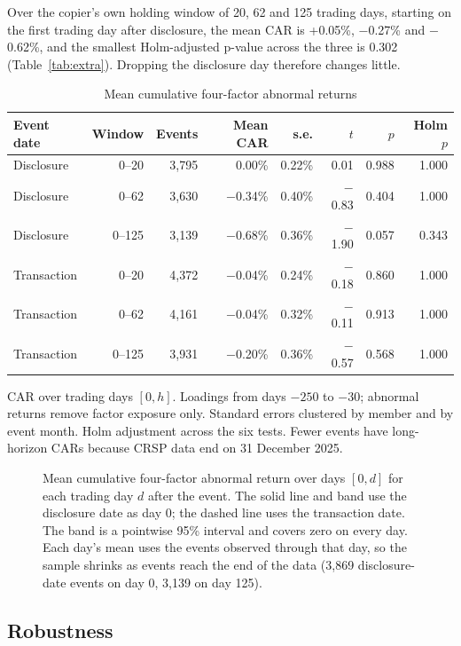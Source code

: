 \documentclass[11pt]{article}
\newcommand{\m}{\ensuremath{-}}
\begin{document}
Over the copier's own holding window of 20, 62 and 125 trading days, starting on the first trading day after disclosure, the mean CAR is +0.05\%, \m0.27\% and \m0.62\%, and the smallest Holm-adjusted p-value across the three is 0.302 (Table~\ref{tab:extra}). Dropping the disclosure day therefore changes little.

\begin{table}[t]
\centering
\caption{Mean cumulative four-factor abnormal returns}\label{tab:cars}
\begin{tabular}{lrrrrrrr}
\toprule
Event date & Window & Events & Mean CAR & s.e. & $t$ & $p$ & Holm $p$ \\
\midrule
Disclosure & 0--20 & 3,795 & 0.00\% & 0.22\% & 0.01 & 0.988 & 1.000 \\
Disclosure & 0--62 & 3,630 & \m0.34\% & 0.40\% & \m0.83 & 0.404 & 1.000 \\
Disclosure & 0--125 & 3,139 & \m0.68\% & 0.36\% & \m1.90 & 0.057 & 0.343 \\
Transaction & 0--20 & 4,372 & \m0.04\% & 0.24\% & \m0.18 & 0.860 & 1.000 \\
Transaction & 0--62 & 4,161 & \m0.04\% & 0.32\% & \m0.11 & 0.913 & 1.000 \\
Transaction & 0--125 & 3,931 & \m0.20\% & 0.36\% & \m0.57 & 0.568 & 1.000 \\
\bottomrule
\end{tabular}

\smallskip
\parbox{0.9\linewidth}{\footnotesize CAR over trading days $[0, h]$. Loadings from days $-250$ to $-30$; abnormal returns remove factor exposure only. Standard errors clustered by member and by event month. Holm adjustment across the six tests. Fewer events have long-horizon CARs because CRSP data end on 31 December 2025.}
\end{table}

\begin{figure}[t]
\centering

\caption{Mean cumulative four-factor abnormal return over days $[0, d]$ for each trading day $d$ after the event. The solid line and band use the disclosure date as day 0; the dashed line uses the transaction date. The band is a pointwise 95\% interval and covers zero on every day. Each day's mean uses the events observed through that day, so the sample shrinks as events reach the end of the data (3,869 disclosure-date events on day 0, 3,139 on day 125).}\label{fig:car}
\end{figure}

\subsection{Robustness}
\end{document}
